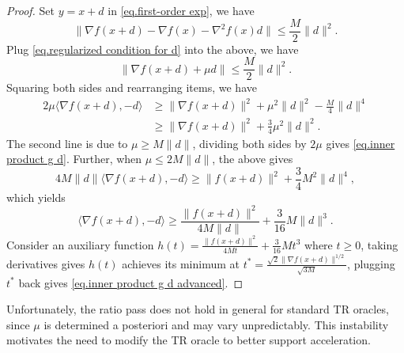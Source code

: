 \documentclass{article}
\begin{document}
\begin{proof}
    Set $y=x+d$ in \eqref{eq.first-order exp}, we have 
    \begin{equation*}
        \|\nabla f(x+d)-\nabla f(x)-\nabla ^2 f(x) d\| \leq \frac{M}{2}\|d\|^2.
    \end{equation*}
    Plug \eqref{eq.regularized condition for d} into the above, we have
    \begin{equation*}
        \|\nabla f(x+d)+\mu d\| \leq \frac{M}{2}\|d\|^2.
    \end{equation*}
    Squaring both sides and rearranging items, we have
    \begin{equation*}
    \begin{aligned}
        2\mu \langle \nabla f(x+d),-d \rangle &\geq \|\nabla f(x+d)\|^2 +\mu^2 \|d\|^2 -\frac{M}{4}\|d\|^4\\
        &\geq \|\nabla f(x+d)\|^2 +\frac{3}{4}\mu^2 \|d\|^2.
    \end{aligned}
    \end{equation*}
    The second line is due to $\mu\geq M\|d\|$, dividing both sides by $2\mu$ gives \eqref{eq.inner product g d}. Further, when $\mu \leq 2M\|d\|$, the above gives
    \begin{equation*}
        4M\|d\| \langle \nabla f(x+d),-d \rangle \geq \|f(x+d)\|^2 +\frac{3}{4} M^2 \|d\|^4,
    \end{equation*}
    which yields
    \begin{equation*}
        \langle \nabla f(x+d),-d \rangle \geq \frac{\|f(x+d)\|^2}{4M\|d\|}+\frac{3}{16}M\|d\|^3.
    \end{equation*}
    Consider an auxiliary function $h(t) = \frac{\|f(x+d)\|^2}{4Mt}+\frac{3}{16}Mt^3$ where $t\geq 0$, taking derivatives gives $h(t)$ achieves its minimum at $t^*= \frac{\sqrt{2}\|\nabla f(x+d)\|^{1/2}}{\sqrt{3M}}$, plugging $t^*$ back gives \eqref{eq.inner product g d advanced}.
\end{proof}
Unfortunately, the ratio pass does not hold in general for standard TR oracles, since $\mu$ is determined a posteriori and may vary unpredictably. This instability motivates the need to modify the TR oracle to better support acceleration.
\end{document}
